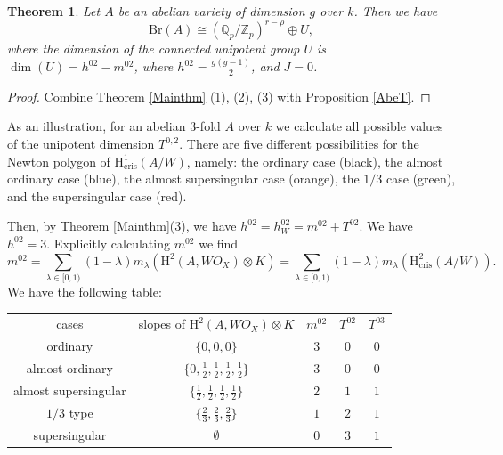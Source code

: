 \documentclass[a4paper,12pt,twoside]{report}
\newtheorem{theorem}{Theorem}[section]
\newcommand{\Q}{\mathbb{Q}}
\newcommand{\Z}{\mathbb{Z}}
\newcommand{\cris}{\mathrm{cris}}
\newcommand{\Br}{\mathrm{Br}}
\newcommand{\HH}{\mathrm{H}}
\begin{document}
\begin{theorem}\label{Abe}
    Let $A$ be an abelian variety of dimension $g$ over $k$. Then we have \[\Br(A)\cong (\Q_p/\Z_p)^{r-\rho}\oplus U,\]
    where the dimension of the connected unipotent group $U$ is $\dim(U)=h^{02}-m^{02}$, where $h^{02}=\frac{g(g-1)}{2}$, and $J=0$. 
\end{theorem}

\begin{proof}
    Combine Theorem \ref{Mainthm} (1), (2), (3) with Proposition \ref{AbeT}. 
\end{proof}

\medskip

As an illustration,
for an abelian 3-fold $A$ over $k$ we calculate all possible values of the unipotent dimension $T^{0,2}$.
There are five different possibilities for the Newton polygon of $\HH^1_{\cris}(A/W)$, 
namely: the ordinary case (black), the almost ordinary case (blue), the almost supersingular case (orange), the $1/3$ case (green), and the supersingular case (red). 
\begin{center}
\end{center}
Then, by Theorem \ref{Mainthm}(3), we have $h^{02}=h_W^{02}=m^{02}+T^{02}$.
We have $h^{02}=3$. Explicitly calculating $m^{02}$ we find
\begin{equation*}
    m^{02}=\sum_{\lambda\in [0,1)}(1-\lambda)m_{\lambda}(\HH^2(A,WO_X)\otimes K)=\sum_{\lambda\in [0,1)}(1-\lambda)m_{\lambda}(\HH^2_{\cris}(A/W)).
\end{equation*}
We have the following table: 
\begin{center}
    \begin{tabular}{ c|c|c|c|c } 
     cases                & slopes of $\HH^2(A,WO_{X})\otimes K$                           & $m^{02}$ & $T^{02}$ & $T^{03}$\\ 
     ordinary             & $\{0,0,0\}$                                                    &  $3$     &   $0$    &  $0$  \\ 
     almost ordinary      & $\{0,\frac{1}{2},\frac{1}{2},\frac{1}{2},\frac{1}{2}\}$        &  $3$     &   $0$    &  $0$  \\           
     almost supersingular &          $\{\frac{1}{2},\frac{1}{2},\frac{1}{2},\frac{1}{2}\}$ &  $2$     &   $1$    &  $1$  \\          
     $1/3$ type           & $\{\frac{2}{3},\frac{2}{3},\frac{2}{3}\}$                      &  $1$     &   $2$    &  $1$  \\                        
     supersingular        & $\emptyset$                                                    &  $0$     &   $3$    &  $1$  
    \end{tabular}
\end{center}
\end{document}
